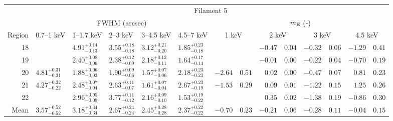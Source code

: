\begin{tabular}{@{}rlllllr@{ $\pm$ }lr@{ $\pm$ }lr@{ $\pm$ }lr@{ $\pm$ }l@{}}
\midrule
{} & \multicolumn{13}{c}{Filament 5} \\
\cmidrule(l){2-14}
{} & \multicolumn{5}{c}{FWHM (arcsec)} & \multicolumn{8}{c}{$m_\mathrm{E}$ (-)} \\
\cmidrule(lr){2-6} \cmidrule(l){7-14}
Region & 0.7--1 keV & 1--1.7 keV & 2--3 keV & 3--4.5 keV & 4.5--7 keV
       & \multicolumn{2}{c}{1 keV} & \multicolumn{2}{c}{2 keV}
       & \multicolumn{2}{c}{3 keV} & \multicolumn{2}{c}{4.5 keV} \\
\cmidrule{1-14}
18 & {} & ${4.91}^{+0.14}_{-0.13}$ & ${3.55}^{+0.18}_{-0.18}$ & ${3.12}^{+0.21}_{-0.20}$ & ${1.85}^{+0.23}_{-0.18}$
  & \multicolumn{2}{c}{} & $-0.47$ & $0.04$ & $-0.32$ & $0.06$ & $-1.29$ & $0.41$ \\
19 & {} & ${2.40}^{+0.08}_{-0.06}$ & ${2.38}^{+0.12}_{-0.09}$ & ${2.18}^{+0.12}_{-0.11}$ & ${1.64}^{+0.17}_{-0.14}$
  & \multicolumn{2}{c}{} & $-0.01$ & $0.00$ & $-0.22$ & $0.04$ & $-0.70$ & $0.19$ \\
20 & ${4.81}^{+0.31}_{-0.31}$ & ${1.88}^{+0.06}_{-0.03}$ & ${1.90}^{+0.09}_{-0.06}$ & ${1.57}^{+0.07}_{-0.06}$ & ${2.18}^{+0.23}_{-0.23}$
  & $-2.64$ & $0.51$ & $0.02$ & $0.00$ & $-0.47$ & $0.07$ & $0.81$ & $0.23$ \\
21 & ${4.27}^{+0.32}_{-0.22}$ & ${2.48}^{+0.07}_{-0.04}$ & ${2.63}^{+0.11}_{-0.07}$ & ${1.61}^{+0.07}_{-0.04}$ & ${2.67}^{+0.23}_{-0.19}$
  & $-1.53$ & $0.29$ & $0.09$ & $0.01$ & $-1.22$ & $0.15$ & $1.25$ & $0.26$ \\
22 & {} & ${2.96}^{+0.05}_{-0.09}$ & ${3.77}^{+0.11}_{-0.12}$ & ${2.16}^{+0.09}_{-0.10}$ & ${1.53}^{+0.19}_{-0.22}$
  & \multicolumn{2}{c}{} & $0.35$ & $0.02$ & $-1.38$ & $0.19$ & $-0.86$ & $0.30$ \\
\midrule
Mean & ${3.57}^{+0.52}_{-0.52}$ & ${3.18}^{+0.34}_{-0.34}$ & ${2.67}^{+0.24}_{-0.24}$ & ${2.45}^{+0.28}_{-0.28}$ & ${2.37}^{+0.22}_{-0.22}$
  & $-0.70$ & $0.23$ & $-0.21$ & $0.06$ & $-0.28$ & $0.11$ & $-0.04$ & $0.15$ \\
\bottomrule
\end{tabular}
